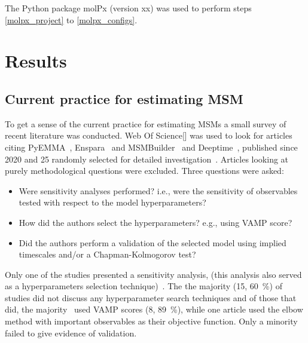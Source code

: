 \documentclass[journal=jacsat,manuscript=article]{achemso}
\begin{document}
The Python package molPx (version xx) was used to perform steps \ref{molpx_project} to \ref{molpx_configs}. 

\section{Results}

\subsection{Current practice for estimating MSM}

To get a sense of the current practice for estimating MSMs a small survey of recent literature was conducted. Web Of Science[] was used to look for articles citing PyEMMA~\cite{schererPyEMMASoftwarePackage2015a}, Enspara~\cite{porter_enspara_2019} and MSMBuilder~\cite{beauchamp_msmbuilder2:_2011} and Deeptime~\cite{deeptime}, published since 2020 and 25 randomly selected for detailed investigation~\cite{tosstorff_study_2020, fernandez-quintero_mutation_2021, kahler_sodium-induced_2020, paul_thermodynamics_2021, quoika_implementation_2021, liu_misfolding_2020, tian_deciphering_2020, hempel_molecular_2021, koulgi_structural_2021., sharma_comparative_2020, mckiernan_dynamical_2020, dutta_distinct_2022, zhou_molecular_2021, fernandez-quintero_cdr_2022, song_modulation_2021, sadiq_multiscale_2021, ibrahim_dynamics_2022, linker_polarapolar_2022, hu_discovery_2022, cannariato_prediction_2022, jones_determining_2021, zhu_critical_2021, zhu_critical_2021, bergh_markov_2021, pantsar_decisive_2022, grabski_molecular_2021}. Articles looking at purely methodological questions were excluded. Three questions were asked: 
\begin{itemize}
    \item Were sensitivity analyses performed? i.e., were the sensitivity of observables tested with respect to the model hyperparameters?
    \item How did the authors select the hyperparameters? e.g., using VAMP score? 
    \item Did the authors perform a validation of the selected model using implied timescales and/or a Chapman-Kolmogorov test? 
\end{itemize}

Only one of the studies presented a sensitivity analysis, (this analysis also served as a hyperparameters selection technique)~\cite{bergh_markov_2021}. The the majority (15, \SI{60}{\percent}) of studies did not discuss any hyperparameter search techniques and of those that did,  the majority~\cite{paul_thermodynamics_2021, koulgi_structural_2021, sharma_comparative_2020, dutta_distinct_2022, zhou_molecular_2021, jones_determining_2021, zhu_critical_2021, grabski_molecular_2021} used VAMP scores (8, \SI{89}{\percent}), while one article used the elbow method with important observables \cite{bergh_markov_2021} as their objective function. Only a minority~\cite{quoika_implementation_2021, hempel_molecular_2021, song_modulation_2021, ibrahim_dynamics_2022} failed to give evidence of validation.  
\end{document}
